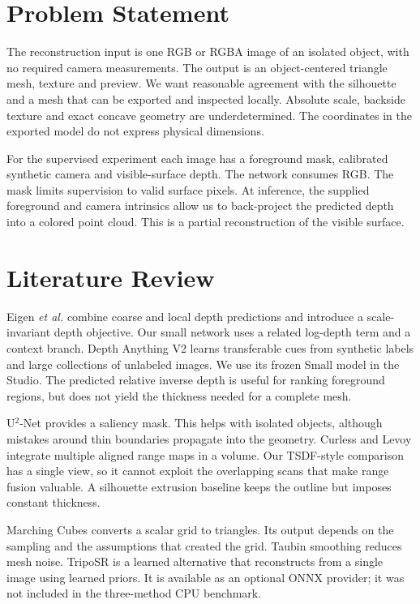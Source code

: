 \documentclass[conference]{IEEEtran}
\begin{document}
\section{Problem Statement}
The reconstruction input is one RGB or RGBA image of an isolated object, with no required camera measurements. The output is an object-centered triangle mesh, texture and preview. We want reasonable agreement with the silhouette and a mesh that can be exported and inspected locally. Absolute scale, backside texture and exact concave geometry are underdetermined. The coordinates in the exported model do not express physical dimensions.

For the supervised experiment each image has a foreground mask, calibrated synthetic camera and visible-surface depth. The network consumes RGB. The mask limits supervision to valid surface pixels. At inference, the supplied foreground and camera intrinsics allow us to back-project the predicted depth into a colored point cloud. This is a partial reconstruction of the visible surface.

\section{Literature Review}
Eigen \emph{et al.} \cite{eigen} combine coarse and local depth predictions and introduce a scale-invariant depth objective. Our small network uses a related log-depth term and a context branch. Depth Anything V2 \cite{depth} learns transferable cues from synthetic labels and large collections of unlabeled images. We use its frozen Small model in the Studio. The predicted relative inverse depth is useful for ranking foreground regions, but does not yield the thickness needed for a complete mesh.

U$^2$-Net \cite{u2} provides a saliency mask. This helps with isolated objects, although mistakes around thin boundaries propagate into the geometry. Curless and Levoy \cite{curless} integrate multiple aligned range maps in a volume. Our TSDF-style comparison has a single view, so it cannot exploit the overlapping scans that make range fusion valuable. A silhouette extrusion baseline keeps the outline but imposes constant thickness.

Marching Cubes \cite{cubes} converts a scalar grid to triangles. Its output depends on the sampling and the assumptions that created the grid. Taubin smoothing \cite{taubin} reduces mesh noise. TripoSR \cite{triposr} is a learned alternative that reconstructs from a single image using learned priors. It is available as an optional ONNX provider; it was not included in the three-method CPU benchmark.
\end{document}
